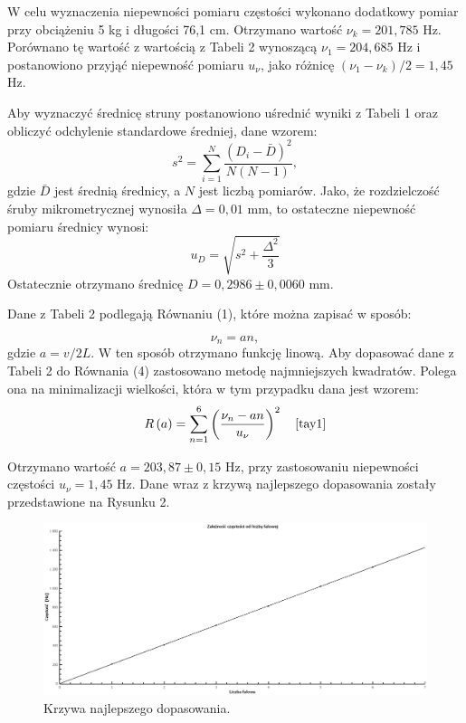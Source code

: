 \documentclass[10pt,a4paper]{article}
\begin{document}
W celu wyznaczenia niepewności pomiaru częstości wykonano dodatkowy pomiar przy obciążeniu 5 kg i długości 76,1 cm. Otrzymano wartość $\nu_{k}=201,785$ Hz. Porównano tę wartość z wartością z Tabeli 2 wynoszącą $\nu_{1}=204,685$ Hz i postanowiono przyjąć niepewność pomiaru $u_{\nu}$, jako różnicę $(\nu_{1}-\nu_{k})/2=1,45 $ Hz.

Aby wyznaczyć średnicę struny postanowiono uśrednić wyniki z Tabeli 1 oraz obliczyć odchylenie standardowe średniej, dane wzorem:
\begin{equation}
s^2=\sum_{i=1}^{N}\dfrac{\left(D_{i}-\bar{D}\right)^2}{N(N-1)},
\end{equation}
gdzie $\bar{D}$ jest średnią średnicy, a $N$ jest liczbą pomiarów. Jako, że rozdzielczość śruby mikrometrycznej wynosiła $\Delta=0,01$ mm, to ostateczne niepewność pomiaru średnicy wynosi:
\begin{equation}
u_{D}=\sqrt{s^2+\dfrac{\Delta^2}{3}}
\end{equation}
Ostatecznie otrzymano średnicę $D=0,2986\pm0,0060$ mm.

Dane z Tabeli 2 podlegają Równaniu (1), które można zapisać w sposób:

\begin{equation}
\nu_{n}=an,
\end{equation}
gdzie $a=v/2L$. W ten sposób otrzymano funkcję linową. Aby dopasować dane z Tabeli 2 do Równania (4) zastosowano metodę najmniejszych kwadratów. Polega ona na minimalizacji wielkości, która w tym przypadku dana jest wzorem:
\begin{equation}
R\left(a \right)=\sum_{n=1}^{6}\left(\dfrac{\nu_{n}-an}{u_{\nu}}\right)^2 \quad \cite{tay1}
\end{equation}

Otrzymano wartość $a=203,87\pm0,15$ Hz, przy zastosowaniu niepewności częstości $u_{\nu}=1,45$ Hz. Dane wraz z krzywą najlepszego dopasowania zostały przedstawione na Rysunku 2.

\begin{figure}[h!]
\includegraphics[width=15cm]{rap10rys1} 
\centering
\caption{Krzywa najlepszego dopasowania.}
\end{figure}
\end{document}
